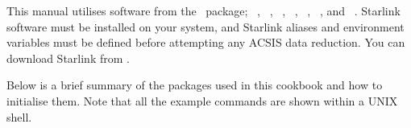 \documentclass[11pt,oneside,chapters]{starlink}
\begin{document}
This manual utilises software from the \starlink\ package; \smurf\
\cite{smurf}, \Kappa\ \cite{kappa}, \gaia\ \cite{gaia}, \oracdr\
\cite{oracdr}, \convert\ \cite{convert}, \ccdpack\ \cite{ccdpack}, and
\picard\ \cite{picard}. Starlink software must be installed on your
system, and Starlink aliases and environment variables must be defined
before attempting any ACSIS data reduction. You can download Starlink
from  .

Below is a brief summary of the packages used in this cookbook and how
to initialise them. Note that all the example commands are shown within
a UNIX shell.

\begin{table}[h!]
\begin{tabular}{p{1.7cm}|p{7.4cm}|p{2.9cm}|p{2.2cm}}


\end{tabular}
\end{table}
\end{document}
